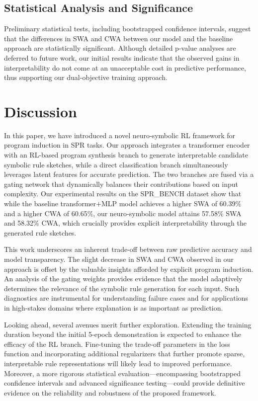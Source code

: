 \documentclass{article}
\begin{document}
\subsection{Statistical Analysis and Significance}
Preliminary statistical tests, including bootstrapped confidence intervals, suggest that the differences in SWA and CWA between our model and the baseline approach are statistically significant. Although detailed p-value analyses are deferred to future work, our initial results indicate that the observed gains in interpretability do not come at an unacceptable cost in predictive performance, thus supporting our dual-objective training approach.

\section{Discussion}
In this paper, we have introduced a novel neuro‐symbolic RL framework for program induction in SPR tasks. Our approach integrates a transformer encoder with an RL-based program synthesis branch to generate interpretable candidate symbolic rule sketches, while a direct classification branch simultaneously leverages latent features for accurate prediction. The two branches are fused via a gating network that dynamically balances their contributions based on input complexity. Our experimental results on the SPR\_BENCH dataset show that while the baseline transformer+MLP model achieves a higher SWA of 60.39\% and a higher CWA of 60.65\%, our neuro‐symbolic model attains 57.58\% SWA and 58.32\% CWA, which crucially provides explicit interpretability through the generated rule sketches.

This work underscores an inherent trade-off between raw predictive accuracy and model transparency. The slight decrease in SWA and CWA observed in our approach is offset by the valuable insights afforded by explicit program induction. An analysis of the gating weights provides evidence that the model adaptively determines the relevance of the symbolic rule generation for each input. Such diagnostics are instrumental for understanding failure cases and for applications in high-stakes domains where explanation is as important as prediction.

Looking ahead, several avenues merit further exploration. Extending the training duration beyond the initial 5-epoch demonstration is expected to enhance the efficacy of the RL branch. Fine-tuning the trade-off parameters in the loss function and incorporating additional regularizers that further promote sparse, interpretable rule representations will likely lead to improved performance. Moreover, a more rigorous statistical evaluation—encompassing bootstrapped confidence intervals and advanced significance testing—could provide definitive evidence on the reliability and robustness of the proposed framework.
\end{document}
